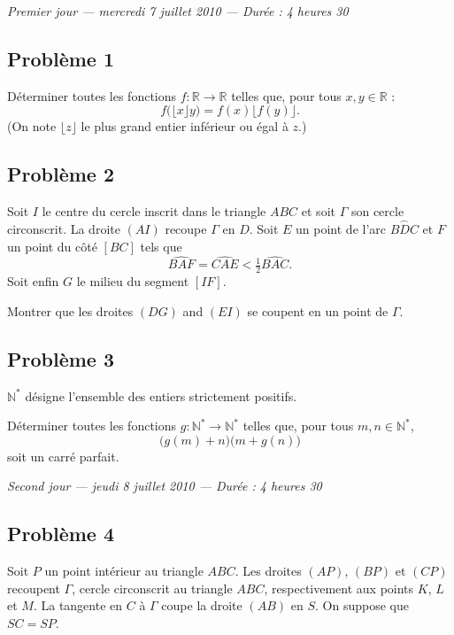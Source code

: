 
\begin{center}
  \emph{Premier jour --- mercredi 7 juillet 2010 --- Durée : 4 heures 30}
\end{center}

\subsection*{Problème 1}
Déterminer toutes les fonctions $f : \mathbb{R} \to \mathbb{R}$ telles que, pour tous $x, y \in \mathbb{R}$ :
\[
f\bigl(\lfloor x \rfloor y\bigr) = f(x)\bigl\lfloor f(y) \bigr\rfloor.
\]
(On note $\lfloor z \rfloor$ le plus grand entier inférieur ou égal à $z$.)

\subsection*{Problème 2}
Soit $I$ le centre du cercle inscrit dans le triangle $ABC$ et soit $\Gamma$ son cercle circonscrit. La droite
$(AI)$ recoupe $\Gamma$ en $D$. Soit $E$ un point de l'arc $\overset{\frown}{BDC}$ et $F$ un point du côté
$[BC]$ tels que
\[
\widehat{BAF} = \widehat{CAE} < \tfrac{1}{2}\widehat{BAC}.
\]
Soit enfin $G$ le milieu du segment $[IF]$.

Montrer que les droites $(DG)$ and $(EI)$ se coupent en un point de $\Gamma$.

\subsection*{Problème 3}
$\mathbb{N}^*$ désigne l'ensemble des entiers strictement positifs.

Déterminer toutes les fonctions $g : \mathbb{N}^* \to \mathbb{N}^*$ telles que, pour tous
$m, n \in \mathbb{N}^*$,
\[
\bigl(g(m) + n\bigr)\bigl(m + g(n)\bigr)
\]
soit un carré parfait.

\bigskip
\begin{center}
  \emph{Second jour --- jeudi 8 juillet 2010 --- Durée : 4 heures 30}
\end{center}

\subsection*{Problème 4}
Soit $P$ un point intérieur au triangle $ABC$. Les droites $(AP)$, $(BP)$ et $(CP)$ recoupent $\Gamma$, cercle
circonscrit au triangle $ABC$, respectivement aux points $K$, $L$ et $M$. La tangente en $C$ à $\Gamma$ coupe
la droite $(AB)$ en $S$. On suppose que $SC = SP$.

